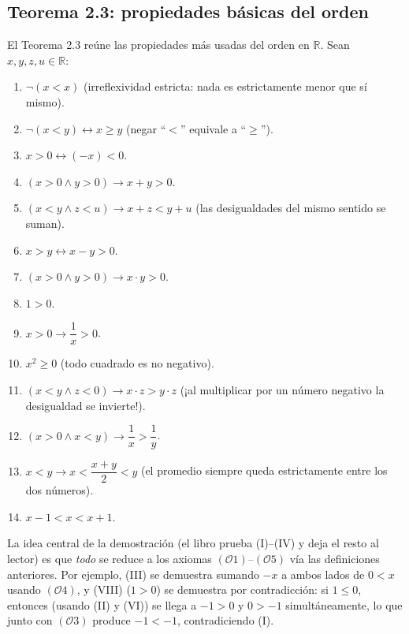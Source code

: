 \documentclass[11pt]{article}
\theoremstyle{plain}
\theoremstyle{definition}
\begin{document}
\subsection{Teorema 2.3: propiedades básicas del orden}

El Teorema 2.3 reúne las propiedades más usadas del orden en $\mathbb{R}$. Sean $x,y,z,u \in \mathbb{R}$:

\begin{enumerate}[label=(\Roman*)]
  \item $\neg(x < x)$ \quad (irreflexividad estricta: nada es estrictamente menor que sí mismo).
  \item $\neg(x<y) \leftrightarrow x \ge y$ \quad (negar ``$<$'' equivale a ``$\ge$'').
  \item $x > 0 \leftrightarrow (-x) < 0$.
  \item $(x>0 \land y>0) \rightarrow x+y>0$.
  \item $(x<y \land z<u) \rightarrow x+z<y+u$ \quad (las desigualdades del mismo sentido se suman).
  \item $x>y \leftrightarrow x-y>0$.
  \item $(x>0 \land y>0) \rightarrow x\cdot y>0$.
  \item $1>0$.
  \item $x>0 \rightarrow \dfrac{1}{x}>0$.
  \item $x^2 \ge 0$ \quad (todo cuadrado es no negativo).
  \item $(x<y \land z<0) \rightarrow x\cdot z > y\cdot z$ \quad (¡al multiplicar por un número negativo la
        desigualdad se invierte!).
  \item $(x>0 \land x<y) \rightarrow \dfrac{1}{x} > \dfrac{1}{y}$.
  \item $x<y \rightarrow x < \dfrac{x+y}{2} < y$ \quad (el promedio siempre queda estrictamente entre
        los dos números).
  \item $x-1<x<x+1$.
\end{enumerate}

La idea central de la demostración (el libro prueba (I)--(IV) y deja el resto al lector) es que
\emph{todo} se reduce a los axiomas $(\mathcal{O}1)$--$(\mathcal{O}5)$ vía las definiciones anteriores.
Por ejemplo, (III) se demuestra sumando $-x$ a ambos lados de $0<x$ usando $(\mathcal{O}4)$, y (VIII)
($1>0$) se demuestra por contradicción: si $1 \le 0$, entonces (usando (II) y (VI)) se llega a
$-1>0$ y $0>-1$ simultáneamente, lo que junto con $(\mathcal{O}3)$ produce $-1<-1$, contradiciendo (I).
\end{document}
